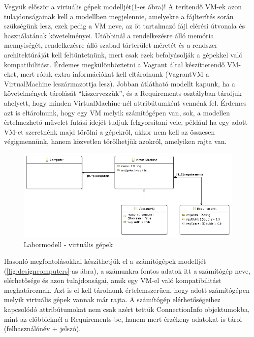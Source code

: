 Vegyük először a virtuális gépek modelljét(\ref{fig:designvm}-es ábra)! A terítendő VM-ek azon tulajdonságainak kell a modellben megjelennie, amelyekre a fájlterítés során szükségünk lesz, ezek pedig a VM neve, az őt tartalmazó fájl elérési útvonala és használatának követelményei. Utóbbinál a rendelkezésre álló memória mennyiségét, rendelkezésre álló szabad tárterület méretét és a rendszer architektúráját kell feltüntetnünk, mert csak ezek befolyásolják a gépekkel való kompatibilitást. Érdemes megkülönböztetni a Vagrant által készíttetendő VM-eket, mert róluk extra információkat kell eltárolnunk (VagrantVM a VirtualMachine leszármazottja lesz). Jobban átlátható modellt kapunk, ha a követelmények tárolását ``kiszervezzük'', és a Requirements osztályban tároljuk ahelyett, hogy minden VirtualMachine-nél attribútumként vennénk fel. Érdemes azt is eltárolnunk, hogy egy VM melyik számítógépen van, sok, a modellen értelmezhető művelet futási idejét tudjuk felgyorsítani vele, például ha egy adott VM-et szeretnénk majd törölni a gépekről, akkor nem kell az összesen végigmennünk, hanem közvetlen törölhetjük azokról, amelyiken rajta van.

\vspace{0.5cm}

\begin{figure}[ht]
	\centering
	\includegraphics[width=130mm, keepaspectratio]{figures/design_vm.png}
	\caption{Labormodell - virtuális gépek}
	\label{fig:designvm}
\end{figure}

\vspace{0.5cm}

Hasonló megfontolásokkal készíthetjük el a számítógépek modelljét (\ref{fig:designcomputers}-as ábra), a számunkra fontos adatok itt a számítógép neve, elérhetősége és azon tulajdonságai, amik egy VM-el való kompatibilitást meghatároznak. Azt is el kell tárolnunk értelemszerűen, hogy adott számítógépen melyik virtuális gépek vannak már rajta. A számítógép elérhetőségeihez kapcsolódó attribútumokat nem csak azért tettük ConnectionInfo objektumokba, mint az előbbieknél a Requirements-be, hanem mert érzékeny adatokat is tárol (felhasználónév + jelszó).

